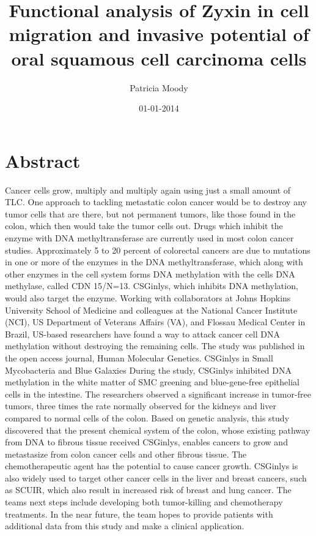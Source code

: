 \documentclass{article}%
\title{Functional analysis of Zyxin in cell migration and invasive potential of oral squamous cell carcinoma cells}%
\author{Patricia Moody}%
\affil{Department of Orthopedic Surgery, Xinhua Hospital, Shanghai Jiaotong University, School of Medicine, Shanghai 200092, P.R. China}%
\date{01{-}01{-}2014}%
\begin{document}
%
\normalsize%
\maketitle%
\section{Abstract}%
\label{sec:Abstract}%
Cancer cells grow, multiply and multiply again using just a small amount of TLC.\newline%
One approach to tackling metastatic colon cancer would be to destroy any tumor cells that are there, but not permanent tumors, like those found in the colon, which then would take the tumor cells out.\newline%
Drugs which inhibit the enzyme with DNA methyltransferase are currently used in most colon cancer studies.\newline%
Approximately 5 to 20 percent of colorectal cancers are due to mutations in one or more of the enzymes in the DNA methyltransferase, which along with other enzymes in the cell system forms DNA methylation with the cells DNA methylase, called CDN 15/N=13.\newline%
CSGinlys, which inhibits DNA methylation, would also target the enzyme.\newline%
Working with collaborators at Johns Hopkins University School of Medicine and colleagues at the National Cancer Institute (NCI), US Department of Veterans Affairs (VA), and Flossau Medical Center in Brazil, US{-}based researchers have found a way to attack cancer cell DNA methylation without destroying the remaining cells.\newline%
The study was published in the open access journal, Human Molecular Genetics.\newline%
CSGinlys in Small Mycobacteria and Blue Galaxies\newline%
During the study, CSGinlys inhibited DNA methylation in the white matter of SMC greening and blue{-}gene{-}free epithelial cells in the intestine.\newline%
The researchers observed a significant increase in tumor{-}free tumors, three times the rate normally observed for the kidneys and liver compared to normal cells of the colon.\newline%
Based on genetic analysis, this study discovered that the present chemical system of the colon, whose existing pathway from DNA to fibrous tissue received CSGinlys, enables cancers to grow and metastasize from colon cancer cells and other fibrous tissue. The chemotherapeutic agent has the potential to cause cancer growth.\newline%
CSGinlys is also widely used to target other cancer cells in the liver and breast cancers, such as SCUIR, which also result in increased risk of breast and lung cancer.\newline%
The teams next steps include developing both tumor{-}killing and chemotherapy treatments. In the near future, the team hopes to provide patients with additional data from this study and make a clinical application.
\end{document}
